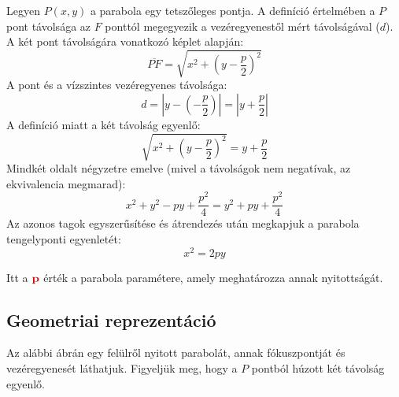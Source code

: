 \documentclass[12pt, a4paper]{article}
\newcommand{\textbfr}[1]{\textbf{\textcolor{bvred}{#1}}}
\begin{document}
Legyen $P(x,y)$ a parabola egy tetszőleges pontja. A definíció értelmében a $P$ pont távolsága az $F$ ponttól megegyezik a vezéregyenestől mért távolságával ($d$). 
A két pont távolságára vonatkozó képlet alapján:
\[ \overline{PF} = \sqrt{x^2 + \left(y - \frac{p}{2}\right)^2} \]
A pont és a vízszintes vezéregyenes távolsága:
\[ d = \left| y - \left(-\frac{p}{2}\right) \right| = \left| y + \frac{p}{2} \right| \]
A definíció miatt a két távolság egyenlő:
\[ \sqrt{x^2 + \left(y - \frac{p}{2}\right)^2} = y + \frac{p}{2} \]
Mindkét oldalt négyzetre emelve (mivel a távolságok nem negatívak, az ekvivalencia megmarad):
\[ x^2 + y^2 - py + \frac{p^2}{4} = y^2 + py + \frac{p^2}{4} \]
Az azonos tagok egyszerűsítése és átrendezés után megkapjuk a parabola tengelyponti egyenletét:
\[ x^2 = 2py \]

Itt a $\textbfr{p}$ érték a parabola paramétere, amely meghatározza annak nyitottságát.

\subsection*{Geometriai reprezentáció}

Az alábbi ábrán egy felülről nyitott parabolát, annak fókuszpontját és vezéregyenesét láthatjuk. Figyeljük meg, hogy a $P$ pontból húzott két távolság egyenlő.

\begin{center}
\end{center}
\end{document}
